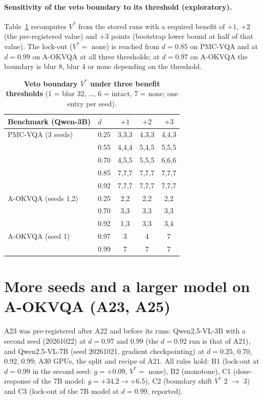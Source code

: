 \paragraph{Sensitivity of the veto boundary to its threshold (exploratory).}
Table~\ref{tab:vsens} recomputes $V^\ast$ from the stored runs with a required benefit of $+1$, $+2$ (the pre-registered value) and $+3$ points (bootstrap lower bound at half of that value).
The lock-out ($V^\ast=$ none) is reached from $d=0.85$ on PMC-VQA and at $d=0.99$ on A-OKVQA at all three thresholds; at $d=0.97$ on A-OKVQA the boundary is blur 8, blur 4 or none depending on the threshold.

\begin{table}[tbp]
  \centering
  \footnotesize
  \setlength{\tabcolsep}{3pt}
  \begin{tabular}{@{}llccc@{}}
    \toprule
    Benchmark (Qwen-3B) & $d$ & $+1$ & $+2$ & $+3$ \\
    \midrule
    PMC-VQA (3 seeds) & 0.25 & 3,3,3 & 4,3,3 & 4,4,3 \\
     & 0.55 & 4,4,4 & 5,4,5 & 5,5,5 \\
     & 0.70 & 4,5,5 & 5,5,5 & 6,6,6 \\
     & 0.85 & 7,7,7 & 7,7,7 & 7,7,7 \\
     & 0.92 & 7,7,7 & 7,7,7 & 7,7,7 \\
    A-OKVQA (seeds 1,2) & 0.25 & 2,2 & 2,2 & 2,2 \\
     & 0.70 & 3,3 & 3,3 & 3,3 \\
     & 0.92 & 1,3 & 3,3 & 3,4 \\
    A-OKVQA (seed 1) & 0.97 & 3 & 4 & 7 \\
     & 0.99 & 7 & 7 & 7 \\
    \bottomrule
  \end{tabular}
  \caption{\textbf{Veto boundary $V^\ast$ under three benefit thresholds} (1 = blur 32, \dots, 6 = intact, 7 = none; one entry per seed).}
  \label{tab:vsens}
\end{table}

\section{More seeds and a larger model on A-OKVQA (A23, A25)}
\label{app:a23}

A23 was pre-registered after A22 and before its runs: Qwen2.5-VL-3B with a second seed (20261022) at $d=0.97$ and $0.99$ (the $d=0.92$ run is that of A21), and Qwen2.5-VL-7B (seed 20261021, gradient checkpointing) at $d=0.25$, 0.70, 0.92, 0.99; A30 GPUs, the split and recipe of A21.
All rules hold: B1 (lock-out at $d=0.99$ in the second seed: $g=+0.09$, $V^\ast=$ none), B2 (monotone), C1 (dose-response of the 7B model: $g=+34.2\to+6.5$), C2 (boundary shift $V^\ast$ 2 $\to$ 3) and C3 (lock-out of the 7B model at $d=0.99$, reported).

